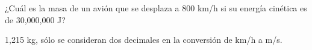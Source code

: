 \question[10] ¿Cuál es la masa de un avión que se desplaza a 800 km/h si su energía
cinética es de 30,000,000 J?

\begin{solutionbox}{2cm}
    1,215 kg, sólo se consideran dos decimales en la conversión de km/h a m/s.
\end{solutionbox}

